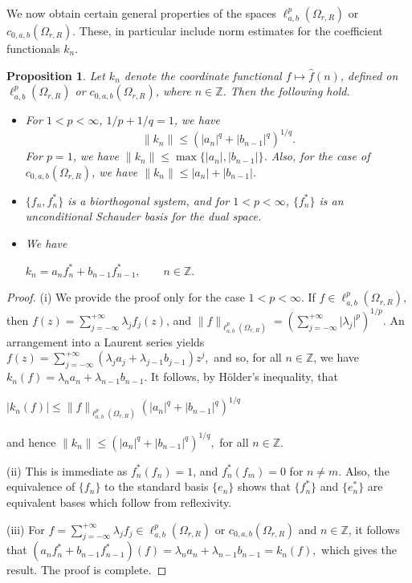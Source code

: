 \documentclass[12pt, reqno]{amsart}
\newtheorem{proposition}[theorem]{Proposition}
\theoremstyle{definition}
\theoremstyle{remark}
\numberwithin{equation}{section}
\begin{document}
We now obtain certain general properties of the spaces $\ell^p_{a,b}(\Omega_{r,R})$ or $c_{0,a,b}(\Omega_{r,R})$. These, in particular include norm estimates for the coefficient functionals $k_n$.
\begin{proposition}\label{k_{n}}
 Let $k_n$ denote the coordinate functional $f\mapsto \widehat{f}(n)$, defined on $\ell^p_{a,b}(\Omega_{r,R})$ or $c_{0,a,b}(\Omega_{r,R})$, where $n\in \mathbb{Z}$. Then the following hold.
    \begin{itemize}
    \item[(i)] For $1<p<\infty$, $1/p+1/q=1$, we have
    \[
    \|k_n\|\leq (|a_n|^q+|b_{n-1}|^q)^{1/q}.
    \]
    For $p=1$, we have $\|k_n\|\leq \max\{|a_n|,|b_{n-1}|\}$. Also, for the case of $c_{0,a,b}(\Omega_{r,R})$, we have $\|k_{n}\|\leq |a_{n}|+|b_{n-1}|$.
    \item[(ii)]  $\{f_n,f_n^*\}$ is a biorthogonal system, and for $1<p<\infty$, $\{f_n^*\}$ is an unconditional Schauder basis for the dual space.
    \item[(iii)] We have 
\begin{center}  
$k_n=  a_nf_n^*+b_{n-1}f_{n-1}^*, ~~~~~~~~~ n\in \mathbb{Z}.$
\end{center}
   \end{itemize}
\end{proposition}
\begin{proof}(i) We provide the proof only for the case $1<p< \infty$. If $f \in \ell^{p}_{a,b}(\Omega_{r,R}),$ then $f(z)=\sum_{j=-\infty}^{+\infty} \lambda_{j}f_{j}(z)$, and $\|f\|_{\ell^p_{a,b}(\Omega_{r,R})}=\left(\sum_{j=-\infty}^{+\infty}\lvert \lambda_j\rvert^p\right)^{1/p}$. An arrangement into a Laurent series yields $f(z)=\sum_{j=-\infty}^{+\infty} (\lambda_ja_j+\lambda_{j-1}b_{j-1})z^j,$ and so, for all $n\in \mathbb{Z}$, we have 
$k_n(f)=\lambda_{n}a_{n}+\lambda_{n-1}b_{n-1}.$
It follows, by H\"{o}lder's inequality, that 
\begin{center}
$|k_n(f)|\leq \|f\|_{\ell^p_{a,b}(\Omega_{r,R})} (|a_n|^q+|b_{n-1}|^q)^{1/q}$
\end{center}
and hence $\|k_n\|\leq (|a_n|^q+|b_{n-1}|^q)^{1/q},$ for all $n\in \mathbb{Z}$.

(ii) This is immediate as $f_n^*(f_n)=1$, and $f_n^*(f_m)=0$ for $n\neq m$. Also, the equivalence of $\{f_n\}$ to the standard basis $\{e_n\}$ shows that $\{f_n^*\}$ and $\{e_n^*\}$ are equivalent bases which follow from reflexivity.

 (iii) For $f=\sum_{j=-\infty}^{+\infty} \lambda_{j}f_{j}\in \ell^{p}_{a,b}(\Omega_{r,R})$ or $c_{0,a,b}(\Omega_{r,R})$ and $n\in \mathbb{Z}$, it follows that $  ( a_nf_n^*+b_{n-1}f_{n-1}^{*})(f)=\lambda_{n}a_{n}+\lambda_{n-1}b_{n-1}=k_{n}(f),
 $ which gives the result. The proof is complete.
\end{proof}
\end{document}

